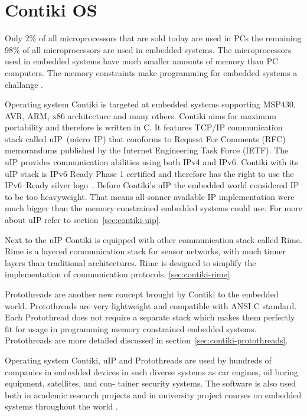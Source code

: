 
\chapter{Contiki OS}
Only 2\% of all microprocessors that are sold today are used in PCs the remaining 98\%
of all microprocessors are used in embedded systems. The microprocessors
used in embedded systems have much smaller amounts of memory than PC computers.
The memory constraints make programming for embedded systems a challange \cite{thesis-programming}.

Operating system Contiki is targeted at embedded systems supporting MSP430, AVR, ARM, x86 architecture and many others.
Contiki aims for maximum portability and therefore is written in C.
It features TCP/IP communication stack called uIP~(micro~IP)
that comforms to Request For Comments (RFC) memorandums published by the Internet Engineering Task Force (IETF).
The uIP provides communication abilities using both IPv4 and IPv6\cite{contiki-docs}.
Contiki with its uIP stack is IPv6 Ready Phase 1 certified
and therefore has the right to use the IPv6~Ready silver logo~\cite{ipv6ready-db}.
Before Contiki's uIP the embedded world considered IP to be too heavyweight.
That means all sonner available IP implementation were much bigger than the memory constrained embedded systems
could use. For more about uIP refer to section~\ref{sec:contiki-uip}.

Next to the uIP Contiki is equipped with other communication stack called Rime.
Rime is a layered communication stack for sensor networks,
with much tinner layers than traditional architectures.
Rime is designed to simplify the implementation of communication
protocols. \ref{sec:contiki-rime}
\!

Protothreads are another new concept brought by Contiki to the embedded world.
Protothreads are very lightweight and compatible with ANSI C standard.
Each Protothread does not require a separate stack which makes them perfectly
fit for usage in programming memory constrained embedded systems.
Protothreads are more detailed discussed in section~\ref{sec:contiki-protothreads}.

Operating system Contiki, uIP and Protothreads are used by hundreds of companies in embedded devices in
such diverse systems as car engines, oil boring equipment, satellites, and con-
tainer security systems. The software is also used both in academic research
projects and in university project courses on embedded systems throughout the
world \cite{thesis-programming}.

